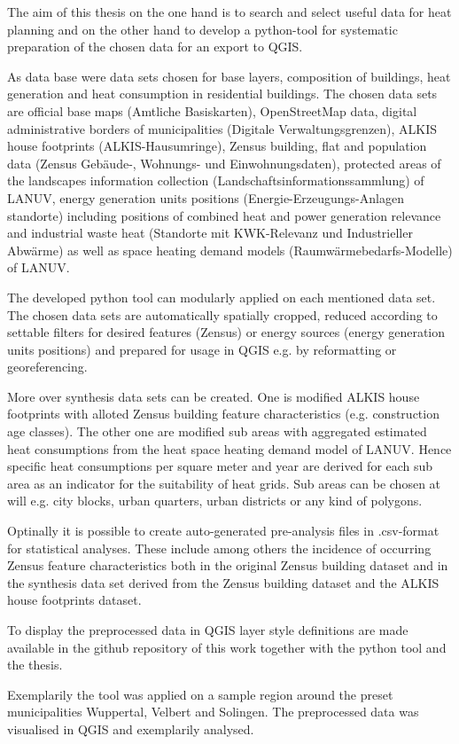 	The aim of this thesis on the one hand is to search and select useful data for heat planning and on the other hand to develop a python-tool for systematic preparation of the chosen data for an export to QGIS. 
	
	As data base were data sets chosen for base layers, composition of buildings, heat generation and heat consumption in residential buildings. The chosen data sets are official base maps (Amtliche Basiskarten), OpenStreetMap data, digital administrative borders of municipalities (Digitale Verwaltungsgrenzen), ALKIS house footprints (ALKIS-Hausumringe), Zensus building, flat and population data (Zensus Gebäude-, Wohnungs- und Einwohnungsdaten), protected areas of the landscapes information collection (Landschaftsinformationssammlung) of LANUV, energy generation units positions (Energie-Erzeugungs-Anlagen standorte) including positions of combined heat and power generation relevance and industrial waste heat (Standorte mit KWK-Relevanz und Industrieller Abwärme) as well as space heating demand models (Raumwärmebedarfs-Modelle) of LANUV.
	
	The developed python tool can modularly applied on each mentioned data set. The chosen data sets are automatically spatially cropped, reduced according to settable filters for desired features (Zensus) or energy sources (energy generation units positions) and prepared for usage in QGIS e.g. by reformatting or georeferencing.
	
	More over synthesis data sets can be created. One is modified ALKIS house footprints with alloted Zensus building feature characteristics (e.g. construction age classes). The other one are modified sub areas with aggregated estimated heat consumptions from the heat space heating demand model of LANUV. Hence specific heat consumptions per square meter and year are derived for each sub area as an indicator for the suitability of heat grids. Sub areas can be chosen at will e.g. city blocks, urban quarters, urban districts or any kind of polygons. 
	
	Optinally it is possible to create auto-generated pre-analysis files in .csv-format for statistical analyses. These include among others the incidence of occurring Zensus feature characteristics both in the original Zensus building dataset and in the synthesis data set derived from the Zensus building dataset and the ALKIS house footprints dataset. 
	
	To display the preprocessed data in QGIS layer style definitions are made available in the github repository of this work together with the python tool and the thesis.
	
	Exemplarily the tool was applied on a sample region around the preset municipalities Wuppertal, Velbert and Solingen. The preprocessed data was visualised in QGIS and exemplarily analysed.
\endgroup
